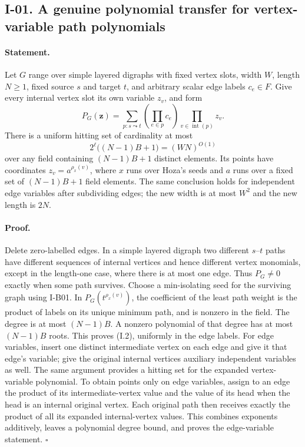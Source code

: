 \subsection{I-01. A genuine polynomial transfer for vertex-variable path polynomials}
\label{I-01}

\paragraph{Statement.}
Let $G$ range over simple layered digraphs with fixed vertex slots,
width $W$, length $N\ge1$, fixed source $s$ and target $t$, and arbitrary
scalar edge labels $c_e\in F$.  Give every internal vertex slot its own
variable $z_v$, and form
\[
 P_G(\mathbf z)=\sum_{p:s\leadsto t}\left(\prod_{e\in p}c_e\right)
                        \prod_{v\in\operatorname{int}(p)}z_v.
\]
There is a uniform hitting set of cardinality at most
\[
 2^{\ell}\bigl((N-1)B+1\bigr)=(WN)^{O(1)}
\tag{I.2}
\]
over any field containing $(N-1)B+1$ distinct elements.  Its points have
coordinates $z_v=a^{\rho_x(v)}$, where $x$ runs over Hoza's seeds and
$a$ runs over a fixed set of $(N-1)B+1$ field elements.  The same conclusion
holds for independent edge variables after subdividing edges; the new
width is at most $W^2$ and the new length is $2N$.

\paragraph{Proof.}
Delete zero-labelled edges.  In a simple layered digraph two different
$s$--$t$ paths have different sequences of internal vertices and hence
different vertex monomials, except in the length-one case, where there
is at most one edge.  Thus $P_G\ne0$ exactly when some path survives.
Choose a min-isolating seed for the surviving graph using I-B01.  In
$P_G(t^{\rho_x(v)})$, the coefficient of the least path weight is the
product of labels on its unique minimum path, and is nonzero in the
field.  The degree is at most $(N-1)B$.  A nonzero polynomial of that
degree has at most $(N-1)B$ roots.  This proves (I.2), uniformly in the
edge labels.  For edge variables, insert one distinct intermediate
vertex on each edge and give it that edge's variable; give the original
internal vertices auxiliary independent variables as well.  The same
argument provides a hitting set for the expanded vertex-variable
polynomial.  To obtain points only on edge variables, assign to an edge
the product of its intermediate-vertex value and the value of its head
when the head is an internal original vertex.  Each original path then
receives exactly the product of all its expanded internal-vertex values.
This combines exponents additively, leaves a polynomial degree bound,
and proves the edge-variable statement. \hfill$\square$


